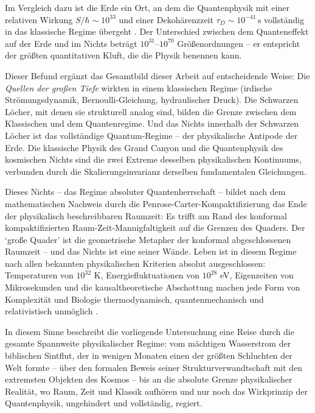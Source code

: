 ﻿\documentclass[12pt,a4paper]{report}
\begin{document}
Im Vergleich dazu ist die Erde ein Ort, an dem die Quantenphysik mit einer relativen Wirkung $S/\hbar \sim 10^{33}$ und einer Dekohärenzzeit $\tau_D \sim 10^{-41}\,\text{s}$ vollständig in das klassische Regime übergeht \cite{zurek2003}. Der Unterschied zwischen dem Quanteneffekt auf der Erde und im Nichts beträgt $10^{31}$--$10^{70}$ Größenordnungen -- er entspricht der größten quantitativen Kluft, die die Physik benennen kann.

Dieser Befund ergänzt das Gesamtbild dieser Arbeit auf entscheidende Weise: Die \textit{Quellen der großen Tiefe} wirkten in einem klassischen Regime (irdische Strömungsdynamik, Bernoulli-Gleichung, hydraulischer Druck). Die Schwarzen Löcher, mit denen sie strukturell analog sind, bilden die Grenze zwischen dem Klassischen und dem Quantenregime. Und das Nichts innerhalb der Schwarzen Löcher ist das vollständige Quantum-Regime -- der physikalische Antipode der Erde. Die klassische Physik des Grand Canyon und die Quantenphysik des kosmischen Nichts sind die zwei Extreme desselben physikalischen Kontinuums, verbunden durch die Skalierungsinvarianz derselben fundamentalen Gleichungen.

Dieses Nichts -- das Regime absoluter Quantenherrschaft -- bildet nach dem mathematischen Nachweis durch die Penrose-Carter-Kompaktifizierung \cite{penrose2004} das Ende der physikalisch beschreibbaren Raumzeit: Es trifft am Rand des konformal kompaktifizierten Raum-Zeit-Mannigfaltigkeit auf die Grenzen des Quaders. Der `große Quader' ist die geometrische Metapher der konformal abgeschlossenen Raumzeit -- und das Nichts ist eine seiner Wände. Leben ist in diesem Regime nach allen bekannten physikalischen Kriterien absolut ausgeschlossen: Temperaturen von $10^{32}$ K, Energiefluktuationen von $10^{28}$ eV, Eigenzeiten von Mikrosekunden und die kausaltheoretische Abschottung machen jede Form von Komplexität und Biologie thermodynamisch, quantenmechanisch und relativistisch unmöglich \cite{bekenstein1973,feynman1965}.

In diesem Sinne beschreibt die vorliegende Untersuchung eine Reise durch die gesamte Spannweite physikalischer Regime: vom mächtigen Wasserstrom der biblischen Sintflut, der in wenigen Monaten einen der größten Schluchten der Welt formte -- über den formalen Beweis seiner Strukturverwandtschaft mit den extremsten Objekten des Kosmos -- bis an die absolute Grenze physikalischer Realität, wo Raum, Zeit und Klassik aufhören und nur noch das Wirkprinzip der Quantenphysik, ungehindert und vollständig, regiert.
\end{document}
